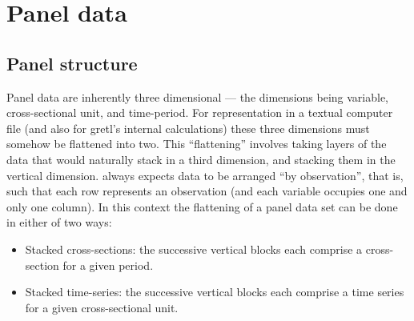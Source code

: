 \chapter{Panel data}
\label{chap-panel}



\section{Panel structure}
\label{panel-structure}

Panel data are inherently three dimensional --- the dimensions being
variable, cross-sectional unit, and time-period.  For representation
in a textual computer file (and also for gretl's internal
calculations) these three dimensions must somehow be flattened into
two.  This ``flattening'' involves taking layers of the data that
would naturally stack in a third dimension, and stacking them in the
vertical dimension. always expects data to be arranged ``by
observation'', that is, such that each row represents an observation
(and each variable occupies one and only one column).  In this context
the flattening of a panel data set can be done in either of two ways:
\begin{itemize}
\item Stacked cross-sections: the successive vertical blocks each
  comprise a cross-section for a given period.
\item Stacked time-series: the successive vertical blocks each
  comprise a time series for a given cross-sectional unit.
\end{itemize}


